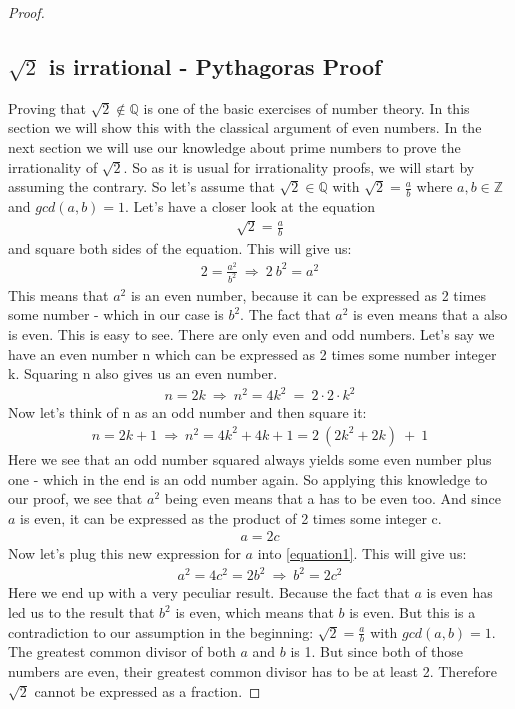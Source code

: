 \documentclass{article}
\theoremstyle{definition}
\begin{document}
\begin{proof}
\subsection{$\sqrt{2}$ is irrational - Pythagoras Proof}
Proving that $\sqrt{2} \not \in \mathbb{Q}$ is one of the basic exercises of number theory. In this section we will show this with the classical argument of even numbers. In the next section we will use our knowledge about prime numbers to prove the irrationality of $\sqrt{2}$. So as it is usual for irrationality proofs, we will start by assuming the contrary.
\newline
So let's assume that $\sqrt{2}\in \mathbb{Q}$ with $\sqrt{2}=\frac{a}{b}$ where $a,b \in \mathbb{Z}$ and $gcd(a,b)=1$.
Let's have a closer look at the equation
\begin{align}
    \sqrt{2} = \frac{a}{b}
\end{align}
and square both sides of the equation. This will give us:
\begin{align}
\label{equation1}
    2 = \frac{a^2}{b^2} \: \Rightarrow  \: 2 \: b^2 = a^2
\end{align}
This means that $a^2$ is an even number, because it can be expressed as 2 times some number - which in our case is $b^2$. The fact that $a^2$ is even means that a also is even. This is easy to see. There are only even and odd numbers. Let's say we have an even  number n which can be expressed as 2 times some number integer k. Squaring n also gives us an even number.
\begin{align}
    n = 2k \: \Rightarrow \: n^2 = 4k^2  \: = \: 2\cdot 2 \cdot k^2
\end{align}
Now let's think of n as an odd number and then square it:
\begin{align}
    n = 2k + 1 \: \Rightarrow \: n^2 = 4k^2 + 4k + 1 = 2\:(2k^2+2k) \: + \: 1
\end{align}
Here we see that an odd number squared always yields some even number plus one - which in the end is an odd number again. So applying this knowledge to our proof, we see that $a^2$ being even means that a has to be even too.
\newline
And since $a$ is even, it can be expressed as the product of 2 times some integer c.
\begin{align}
    a = 2c
\end{align}
Now let's plug this new expression for $a$ into \ref{equation1}. This will give us:
\begin{align}
    a^2 = 4c^2 = 2b^2 \:  \Rightarrow \: b^2 = 2c^2
\end{align}
Here we end up with a very peculiar result. Because the fact that $a$ is even has led us to the result that $b^2$ is even, which means that $b$ is even. But this is a contradiction to our assumption in the beginning: $\sqrt{2} = \frac{a}{b}$ with $gcd(a,b)=1$. The greatest common divisor of both $a$ and $b$ is 1. But since both of those numbers are even, their greatest common divisor has to be at least 2. Therefore $\sqrt{2}$ cannot be expressed as a fraction. 
\newpage 


\end{proof}
\end{document}
